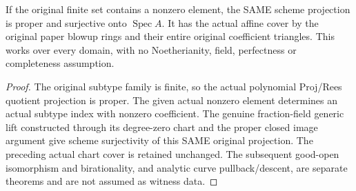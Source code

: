 \begin{theorem}
\label{scheme:paper-rees-proper-surjective-witness}
\leanok
{}
If the original finite set contains a nonzero element, the SAME scheme
projection is proper and surjective onto $\operatorname{Spec}A$. It has the
actual affine cover by the original paper blowup rings and their entire
original coefficient triangles. This works over every domain, with no
Noetherianity, field, perfectness or completeness assumption.
\end{theorem}
\begin{proof}
The original subtype family is finite, so the actual polynomial Proj/Rees
quotient projection is proper. The given actual nonzero element determines
an actual subtype index with nonzero coefficient. The genuine fraction-field
generic lift constructed through its degree-zero chart and the proper closed
image argument give scheme surjectivity of this SAME original projection.
The preceding actual chart cover is retained unchanged. The subsequent
good-open isomorphism and birationality, and analytic curve pullback/descent,
are separate theorems and are not assumed as witness data.
\end{proof}
